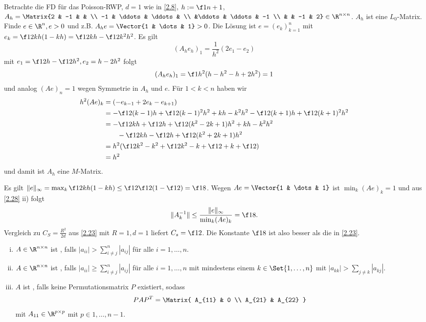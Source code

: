 \begin{ex*}
	Betrachte die FD für das Poisson-RWP, $d = 1$ wie in \ref{2.8}, $h := \f 1{n+1}$, $A_h = \Matrix{2 & -1 &  & \\ -1 & \ddots & \ddots & \\ &\ddots & \ddots & -1 \\ & & -1 & 2} \in \R^{n\times n}$.
	$A_h$ ist eine $L_0$-Matrix.
	Finde $e \in \R^n, e > 0$ und z.B. $A_h e = \Vector{1 & \dots & 1} > 0$.
	Die Lösung ist $e = (e_k)_{k=1}^n$ mit $e_k = \f 12 k h  (1-kh) = \f 12 kh - \f 12 k^2h^2$.
	Es gilt
	\[
		(A_h e_h)_1 = \frac{1}{h^2} (2e_1 - e_2)
	\]
	mit $e_1 = \f 12 h - \f 12 h^2, e_2 = h - 2h^2$ folgt
	\[
		(A_h e_h)_1 = \f 1{h^2}(h - h^2 - h + 2h^2) = 1
	\]
	und analog $(Ae)_n = 1$ wegen Symmetrie in $A_h$ und $e$.
	Für $1 < k < n$ haben wir
	\begin{align*}
		h^2 (Ae)_k
		&= (-e_{k-1} + 2e_k - e_{k+1}) \\
		&= -\f 12 (k-1)h + \f 12(k-1)^2 h^2 + kh -k^2 h^2 - \f 12 (k+1)h + \f 12 (k+1)^2 h^2 \\
		&= -\f 12 kh + \f 12 h + \f 12(k^2 - 2k + 1)h^2 + kh - k^2h^2 \\
		&\qquad - \f 12 kh - \f 12 h + \f 12 (k^2 + 2k+1)h^2 \\
		&= h^2( \f 12 k^2 - k^2 + \f 12 k^2 - k + \f 12 + k + \f 12) \\
		&= h^2
	\end{align*}
	und damit ist $A_h$ eine $M$-Matrix.

	Es gilt $\|e\|_\infty = \max_k \f 12 kh(1-kh) \le \f 12 \f 12 ( 1 - \f 12) = \f 18$.
	Wegen $Ae = \Vector{1 & \dots & 1}$ ist $\min_k (Ae)_k = 1$ und aus \ref{2.28} ii) folgt
	\[
		\|A_k^{-1}\| \le \frac{\|e\|_\infty}{\min_k (Ae)_k} = \f 18.
	\]
	Vergleich zu $C_S = \frac{R^2}{2d}$ aus \ref{2.23} mit $R = 1, d=1$ liefert $C_s = \f 12$.
	Die Konstante $\f 18$ ist also besser als die in \ref{2.23}.
\end{ex*}

\begin{df}
	\begin{enumerate}[i)]
		\item
			$A \in \R^{n\times n}$ ist , falls $|a_{ii}| > \sum_{i \neq j}^n |a_{ij}|$ für alle $i = 1, \dotsc, n$.
		\item
			$A \in \R^{n\times n}$ ist , falls $|a_{ii}| \ge \sum_{i \neq j}^n |a_{ij}|$ für alle $i = 1, \dotsc, n$ mit mindestens einem $k \in \Set{1,\dotsc, n}$ mit $|a_{kk}| > \sum_{j \neq k} |a_{kj}|$.
		\item
			$A$ ist , falls keine Permutationsmatrix $P$ existiert, sodass
			\[
				P A P^T = \Matrix{ A_{11} & 0 \\ A_{21} & A_{22} }
			\]
			mit $A_{11} \in \R^{p\times p}$ mit $p \in {1, \dotsc, n-1}$.
	\end{enumerate}
\end{df}

